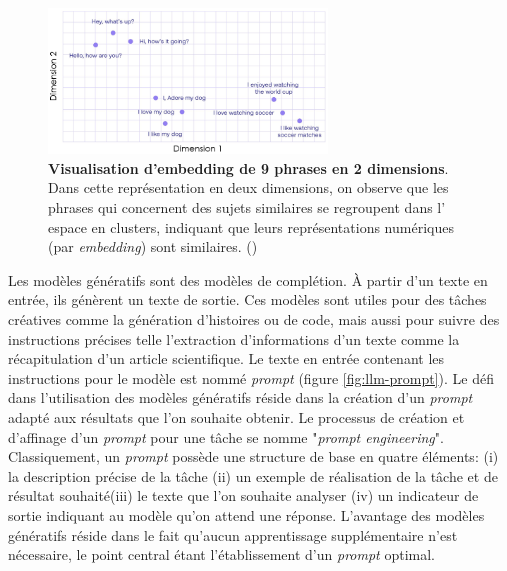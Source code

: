 \begin{figure}[!htbp]
 \centering
 \includegraphics[width=0.66\textwidth]{figures/sentence_embed.png}
 \caption[Visualisation d'embedding de 9 phrases en 2 dimensions]{\textbf{Visualisation d'embedding de 9 phrases en 2 dimensions}. Dans cette représentation en deux dimensions, on observe que les phrases qui concernent des sujets similaires se regroupent dans l' espace en clusters, indiquant que leurs représentations numériques (par \textit{embedding}) sont similaires. (\cite{luis_serrano_what_2023})}
 \label{fig:sentence_embed}
\end{figure}


Les modèles génératifs sont des modèles de complétion. À partir d'un texte en entrée, ils génèrent un texte de sortie. Ces modèles sont utiles pour des tâches créatives comme la génération d'histoires ou de code, mais aussi pour suivre des instructions précises telle l'extraction d'informations d'un texte comme la récapitulation d'un article scientifique. Le texte en entrée contenant les instructions pour le modèle est nommé \textit{prompt} (figure \ref{fig:llm-prompt}). Le défi dans l'utilisation des modèles génératifs réside dans la création d'un \textit{prompt} adapté aux résultats que l'on souhaite obtenir. Le processus de création et d'affinage d'un \textit{prompt} pour une tâche se nomme "\textit{prompt engineering}". Classiquement, un \textit{prompt} possède une structure de base en quatre éléments: (i) la description précise de la tâche (ii) un exemple de réalisation de la tâche et de résultat souhaité(iii) le texte que l'on souhaite analyser (iv) un indicateur de sortie indiquant au modèle qu'on attend une réponse. L'avantage des modèles génératifs réside dans le fait qu'aucun apprentissage supplémentaire n'est nécessaire, le point central étant l'établissement d'un \textit{prompt} optimal.

